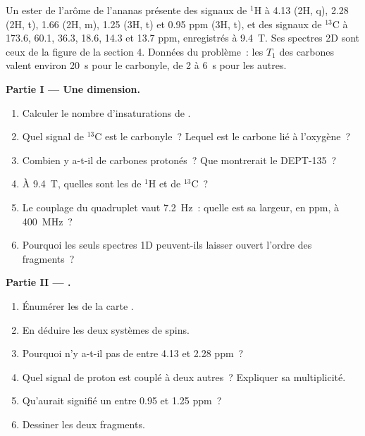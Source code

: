 \begin{problem}
\label{pb:b3:advanced-nmr:1}
Un ester  de l'arôme de l'ananas présente des signaux de
${}^1$H à 4.13 (2H,
q), 2.28 (2H, t), 1.66 (2H, m), 1.25 (3H, t) et 0.95 ppm (3H, t), et des
signaux de ${}^{13}$C
à 173.6, 60.1, 36.3, 18.6, 14.3 et 13.7 ppm, enregistrés à
\qty{9.4}{T}. Ses spectres 2D sont ceux de la figure de la section 4.
Données du problème~: les $T_1$
des carbones valent environ \qty{20}{s} pour le carbonyle, de 2 à
\qty{6}{s} pour les autres.

\medskip\noindent\textbf{Partie I --- Une dimension.}
\begin{enumerate}
  \item Calculer le nombre d'insaturations de .
  \item Quel signal de ${}^{13}$C est le carbonyle~? Lequel est le carbone
        lié à l'oxygène~?
  \item Combien y a-t-il de carbones protonés~? Que montrerait le
        DEPT-135~?
  \item À \qty{9.4}{T}, quelles sont les  de ${}^1$H
        et de ${}^{13}$C~?
  \item Le couplage du quadruplet vaut \qty{7.2}{Hz}~: quelle est sa
        largeur, en ppm, à \qty{400}{MHz}~?
  \item Pourquoi les seuls spectres 1D peuvent-ils laisser ouvert l'ordre
        des fragments~?
\end{enumerate}

\medskip\noindent\textbf{Partie II --- .}
\begin{enumerate}[resume]
  \item Énumérer les  de la carte .
  \item En déduire les deux systèmes de spins.
  \item Pourquoi n'y a-t-il pas de  entre 4.13 et
        2.28 ppm~?
  \item Quel signal de proton est couplé à deux autres~? Expliquer sa
        multiplicité.
  \item Qu'aurait signifié un  entre 0.95 et
        1.25 ppm~?
  \item Dessiner les deux fragments.
\end{enumerate}


\end{problem}
